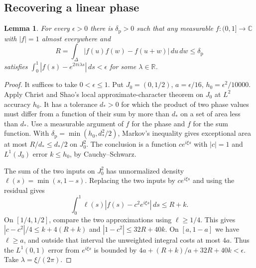 \documentclass[11pt,reqno]{amsart}
\newtheorem{lemma}[theorem]{Lemma}
\newcommand{\R}{\mathbb R}
\numberwithin{equation}{section}
\begin{document}
\subsection{Recovering a linear phase}\label{sec:linear-phase}

\begin{lemma}\label{lem:phase}
For every \(\epsilon>0\) there is \(\delta_{\mathrm p}>0\)
such that any measurable \(f:(0,1]\to\mathbb C\) with \(|f|=1\)
almost everywhere and
\[
 R=\int_\Delta |f(u)f(w)-f(u+w)|\,du\,dw\le\delta_{\mathrm p}
\]
satisfies \(\int_0^1|f(s)-e^{2\pi i\lambda s}|\,ds<\epsilon\)
for some \(\lambda\in\R\).
\end{lemma}

\begin{proof}
It suffices to take \(0<\epsilon\le1\).
Put \(J_0=(0,1/2)\), \(a=\epsilon/16\), \(h_0=\epsilon^2/10000\).
Apply Christ and Shao's local approximate-character theorem
\cite[Proposition~5.1]{christ-shao} on \(J_0\) at \(L^2\) accuracy
\(h_0\). It has a tolerance \(d_*>0\) for which the product of two
phase values must differ from a function of their sum by more than
\(d_*\) on a set of area less than \(d_*\).
Use a measurable argument of \(f\) for the phase and \(f\) for
the sum function. With \(\delta_{\mathrm p}=\min(h_0,d_*^2/2)\),
Markov's inequality gives exceptional area at most \(R/d_*\le d_*/2\)
on \(J_0^2\). The conclusion is a function \(ce^{i\xi s}\) with
\(|c|=1\) and \(L^1(J_0)\) error \(k\le h_0\), by Cauchy--Schwarz.

The sum of the two inputs on \(J_0^2\) has unnormalized density
\(\ell(s)=\min(s,1-s)\). Replacing the two inputs by \(ce^{i\xi s}\)
and using the residual gives
\[
 \int_0^1\ell(s)|f(s)-c^2 e^{i\xi s}|\,ds\le R+k .
\]
On \([1/4,1/2]\), compare the two approximations using \(\ell\ge1/4\).
This gives \(|c-c^2|/4\le k+4(R+k)\) and
\(|1-c^2|\le32R+40k\).
On \([a,1-a]\) we have \(\ell\ge a\), and outside that interval
the unweighted integral costs at most \(4a\).
Thus the \(L^1(0,1)\) error from \(e^{i\xi s}\) is bounded by
\(4a+(R+k)/a+32R+40k<\epsilon\). Take \(\lambda=\xi/(2\pi)\).
\end{proof}
\end{document}
